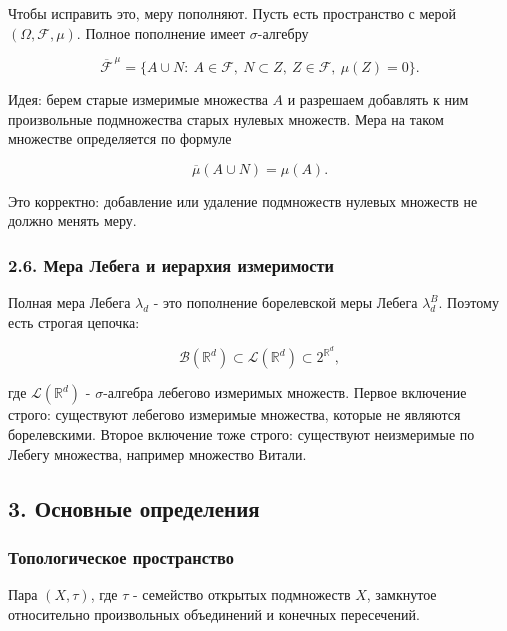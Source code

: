 \documentclass[
  11pt,
  a4paper,
]{article}
\begin{document}
Чтобы исправить это, меру пополняют. Пусть есть пространство с мерой
\((\Omega,\mathcal F,\mu)\). Полное пополнение имеет \(\sigma\)-алгебру

\[
\overline{\mathcal F}^{\,\mu}
=
\{A\cup N:\ A\in\mathcal F,\ N\subset Z,\ Z\in\mathcal F,\ \mu(Z)=0\}.
\]

Идея: берем старые измеримые множества \(A\) и разрешаем добавлять к ним
произвольные подмножества старых нулевых множеств. Мера на таком
множестве определяется по формуле

\[
\overline{\mu}(A\cup N)=\mu(A).
\]

Это корректно: добавление или удаление подмножеств нулевых множеств не
должно менять меру.

\subsubsection{2.6. Мера Лебега и иерархия
измеримости}\label{ux43cux435ux440ux430-ux43bux435ux431ux435ux433ux430-ux438-ux438ux435ux440ux430ux440ux445ux438ux44f-ux438ux437ux43cux435ux440ux438ux43cux43eux441ux442ux438}

Полная мера Лебега \(\lambda_d\) - это пополнение борелевской меры
Лебега \(\lambda_d^B\). Поэтому есть строгая цепочка:

\[
\mathcal B(\mathbb R^d)
\subset
\mathcal L(\mathbb R^d)
\subset
2^{\mathbb R^d},
\]

где \(\mathcal L(\mathbb R^d)\) - \(\sigma\)-алгебра лебегово измеримых
множеств. Первое включение строго: существуют лебегово измеримые
множества, которые не являются борелевскими. Второе включение тоже
строго: существуют неизмеримые по Лебегу множества, например множество
Витали.

\subsection{3. Основные
определения}\label{ux43eux441ux43dux43eux432ux43dux44bux435-ux43eux43fux440ux435ux434ux435ux43bux435ux43dux438ux44f}

\subsubsection{Топологическое
пространство}\label{ux442ux43eux43fux43eux43bux43eux433ux438ux447ux435ux441ux43aux43eux435-ux43fux440ux43eux441ux442ux440ux430ux43dux441ux442ux432ux43e}

Пара \((X,\tau)\), где \(\tau\) - семейство открытых подмножеств \(X\),
замкнутое относительно произвольных объединений и конечных пересечений.
\end{document}
